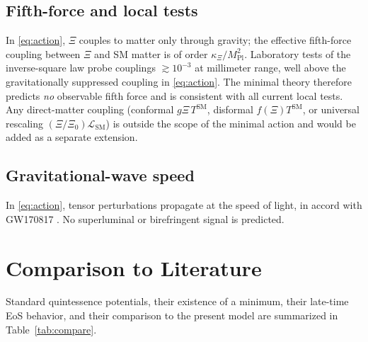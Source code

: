 \documentclass[11pt,reqno]{amsart}
\theoremstyle{plain}
\theoremstyle{definition}
\theoremstyle{remark}
\newcommand{\Pl}{\mathrm{Pl}}
\newcommand{\SM}{\mathrm{SM}}
\begin{document}
\subsection{Fifth-force and local tests}

In \eqref{eq:action}, $\Xi$ couples to matter only through gravity; the
effective fifth-force coupling between $\Xi$ and SM matter is of order
$\kappa_\Xi/M_\Pl^{2}$. Laboratory tests of the inverse-square law
\cite{EotWash,MICROSCOPE} probe couplings $\gtrsim 10^{-3}$ at millimeter range,
well above the gravitationally suppressed coupling in \eqref{eq:action}. The
minimal theory therefore predicts \emph{no} observable fifth force and is
consistent with all current local tests. Any direct-matter coupling
(conformal $g\Xi\, T^{\SM}$, disformal $f(\Xi)T^{\SM}$, or universal
rescaling $(\Xi/\Xi_0)\mathcal{L}_{\SM}$) is outside the scope of the minimal
action and would be added as a separate extension.

\subsection{Gravitational-wave speed}

In \eqref{eq:action}, tensor perturbations propagate at the speed of light, in
accord with GW170817 \cite{GW170817}. No superluminal or birefringent signal is
predicted.

\section{Comparison to Literature}\label{sec:comparison}

Standard quintessence potentials, their existence of a minimum, their late-time
EoS behavior, and their comparison to the present model are summarized in
Table~\ref{tab:compare}.
\end{document}

